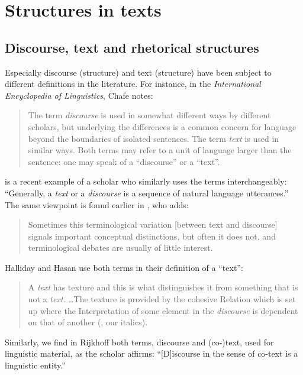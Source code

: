 \documentclass[output=paper]{LSP/langsci}
\begin{document}
\largerpage
\section{Structures in texts}\label{sec:korzen:2}
\subsection{Discourse, text and rhetorical structures}\label{sec:korzen:2.1}

Especially discourse (structure) and text (structure) have been subject to different definitions in the literature. For instance, in the \textit{International Encyclopedia of Linguistics}, Chafe notes:

\begin{quote} The term \textit{discourse} is used in somewhat different ways by different scholars, but underlying the differences is a common concern for language beyond the boundaries of isolated sentences. The term \textit{text} is used in similar ways. Both terms may refer to a unit of language larger than the sentence: one may speak of a ``discourse'' or a ``text''. \citep[440]{Chafe2003}
\end{quote}

\citet{Irmer2011} is a recent example of a scholar who similarly uses the terms interchangeably: ``Generally, a \textit{text} or a \textit{discourse} is a sequence of natural language utterances.''
The same viewpoint is found earlier in \citeauthor{Stubbs1996}, who adds: 

\begin{quote}
Sometimes this terminological variation [between text and discourse] signals important conceptual distinctions, but often it does not, and terminological debates are usually of little interest. \citep[4]{Stubbs1996}
\end{quote}

Halliday and Hasan use both terms in their definition of a ``text'': 

\begin{quote}
A \textit{text} has texture and this is what distinguishes it from something that is not a \textit{text}. \ldots  The texture is provided by the cohesive {\sc Relation} which is set up where the {\sc Interpretation} of some element in the \textit{discourse} is dependent on that of another (\citealt[2-4]{Hasan1976}, our italics).
\end{quote}

Similarly, we find in Rijkhoff \citeyear[90]{Rijkhoff2008} both terms, discourse and (co-)text, used for linguistic material, as the scholar affirms: ``[D]iscourse in the sense of co-text is a linguistic entity.''
\end{document}
